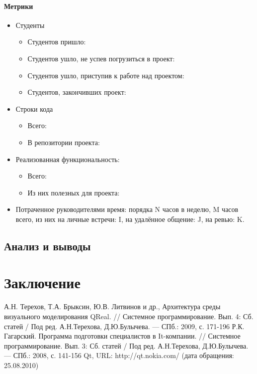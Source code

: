 \documentclass[a5paper]{article}
\begin{document}
\paragraph{Метрики}
\begin{itemize}
	\item Студенты
		\begin{itemize}
			\item Студентов пришло: 
			\item Студентов ушло, не успев погрузиться в проект:
			\item Студентов ушло, приступив к работе над проектом:
			\item Студентов, закончивших проект:
		\end{itemize}
	\item Строки кода
		\begin{itemize}
			\item Всего:
			\item В репозитории проекта:
		\end{itemize}
	\item Реализованная функциональность:
		\begin{itemize}
			\item Всего: 
			\item Из них полезных для проекта: 
		\end{itemize}
	\item Потраченное руководителями время: порядка N часов в неделю, M часов всего, из них на личные встречи: I, на удалённое общение: J, на ревью: K.
\end{itemize}

\subsection{Анализ и выводы}

\section*{Заключение}

\pagebreak

\begin{thebibliography}{9000}
   А.Н. Терехов, Т.А. Брыксин, Ю.В. Литвинов и др., Архитектура среды визуального моделирования QReal. // Системное 
программирование. Вып. 4: Сб. статей / Под ред. А.Н.Терехова, Д.Ю.Булычева. --- СПб.: 2009, с. 171-196
   Р.К. Гагарский. Программа подготовки специалистов в It-компании. // Системное 
программирование. Вып. 3: Сб. статей / Под ред. А.Н.Терехова, Д.Ю.Булычева. --- СПб.: 2008, с. 141-156
   Qt, URL: http://qt.nokia.com/ (дата обращения: 25.08.2010)
\end{thebibliography}
  
\end{document}
